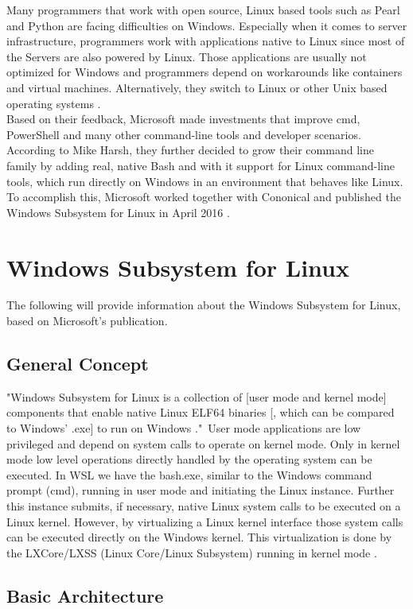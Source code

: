 \documentclass[utf8,biblatex, ngerman, english]{lni}
\begin{document}
Many programmers that work with open source, Linux based tools such as Pearl and Python are facing difficulties on Windows. Especially when it comes to server infrastructure, programmers work with applications native to Linux since most of the Servers are also powered by Linux. Those applications are usually not optimized for Windows and programmers depend on workarounds like containers and virtual machines. Alternatively, they switch to Linux or other Unix based operating systems \cite{Ha16c}.\\
Based on their feedback, Microsoft made investments that improve cmd, PowerShell and many other command-line tools and developer scenarios. According to Mike Harsh, they further decided to grow their command line family by adding real, native Bash and with it support for Linux command-line tools, which run directly on Windows in an environment that behaves like Linux. To accomplish this, Microsoft worked together with Cononical and published the Windows Subsystem for Linux in April 2016 \cite{Ha16c}. 

\section{Windows Subsystem for Linux}
The following will provide information about the Windows Subsystem for Linux, based on Microsoft's publication.

\subsection{General Concept}
"Windows Subsystem for Linux is a collection of [user mode and kernel mode] components that enable native Linux ELF64 binaries [, which can be compared to Windows' .exe] to run on Windows \cite{Ha16b}."\ User mode applications are low privileged and depend on system calls to operate on kernel mode. Only in kernel mode low level operations directly handled by the operating system can be executed. In WSL we have the bash.exe, similar to the Windows command prompt (cmd), running in user mode and initiating the Linux instance. Further this instance submits, if necessary, native Linux system calls to be executed on a Linux kernel. However, by virtualizing a Linux kernel interface those system calls can be executed directly on the Windows kernel. This virtualization is done by the LXCore/LXSS (Linux Core/Linux Subsystem) running in kernel mode \cite{Ha16b}.

\subsection{Basic Architecture}
\end{document}
